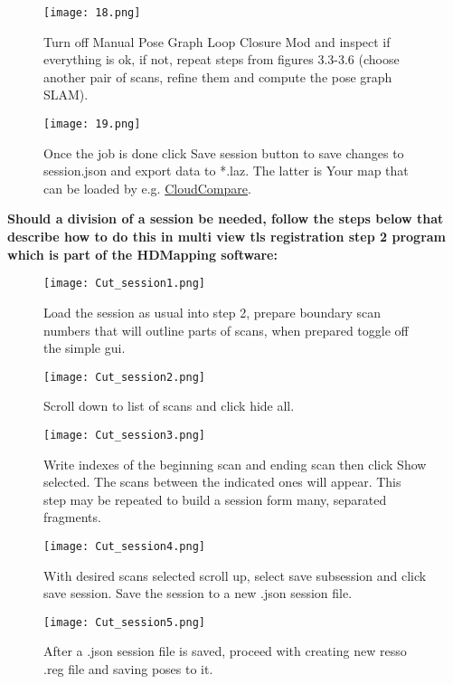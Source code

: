 \begin{figure}[H]
	\centering
	\texttt{[image: 18.png]}
	\caption{Turn off Manual Pose Graph Loop Closure Mod and inspect if everything is ok, if not,  repeat steps from figures 3.3-3.6 (choose another pair of scans, refine them and compute the pose graph SLAM).}
	\label{fig:18}
\end{figure}

\begin{figure}[H]
	\centering
	\texttt{[image: 19.png]}
	\caption{Once the job is done click Save session button to save changes to session.json and export data to *.laz. The latter is Your map that can be loaded by e.g. \href{https://www.cloudcompare.org/}{CloudCompare}.}
	\label{fig:19}
\end{figure}
\pagebreak
{\large \textbf{Should a division of a session be needed, follow the steps below that describe how to do this in multi view tls registration step 2 program which is part of the HDMapping software:}}
\begin{figure}[H]
	\centering
	\texttt{[image: Cut\_session1.png]}
	\caption{Load the session as usual into step 2, prepare boundary scan numbers that will outline parts of scans, when prepared toggle off the simple gui.}
	\label{fig:20}
\end{figure}

\begin{figure}[H]
	\centering
	\texttt{[image: Cut\_session2.png]}
	\caption{Scroll down to list of scans and click hide all.}
	\label{fig:21}
\end{figure}

\begin{figure}[H]
	\centering
	\texttt{[image: Cut\_session3.png]}
	\caption{Write indexes of the beginning scan and ending scan then click Show selected. The scans between the indicated ones will appear. This step may be repeated to build a session form many, separated fragments.}
	\label{fig:22}
\end{figure}

\begin{figure}[H]
	\centering
	\texttt{[image: Cut\_session4.png]}
	\caption{With desired scans selected scroll up, select save subsession and click save session. Save the session to a new .json session file.}
	\label{fig:23}
\end{figure}

\begin{figure}[H]
	\centering
	\texttt{[image: Cut\_session5.png]}
	\caption{After a .json session file is saved, proceed with creating new resso .reg file and saving poses to it.}
	\label{fig:24}
\end{figure}


